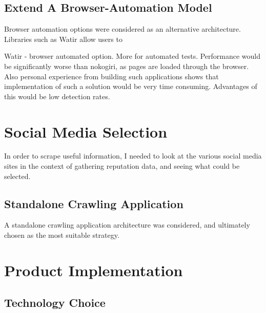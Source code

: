 \subsection{Extend A Browser-Automation Model}

Browser automation options were considered as an alternative architecture. Libraries such as Watir allow users to 

Watir - browser automated option. More for automated tests. Performance would be significantly worse than nokogiri, as pages are loaded through the browser. Also personal experience from building such applications shows that implementation of such a solution would be very time consuming. Advantages of this would be low detection rates. 

\section{Social Media Selection}

In order to scrape useful information, I needed to look at the various social media sites in the context of gathering reputation data, and seeing what could be selected. 

\subsection{Standalone Crawling Application}

A standalone crawling application architecture was considered, and ultimately chosen as the most suitable strategy. 

\section{Product Implementation}

\subsection{Technology Choice}





